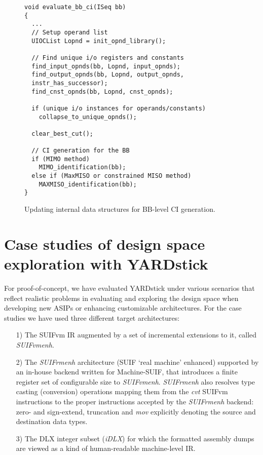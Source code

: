 \documentclass{comjnl}
\begin{document}
\begin{figure}[tb]
\centering
{
{\footnotesize
\begin{verbatim}
void evaluate_bb_ci(ISeq bb)
{
  ... 
  // Setup operand list
  UIOCList Lopnd = init_opnd_library();

  // Find unique i/o registers and constants
  find_input_opnds(bb, Lopnd, input_opnds);
  find_output_opnds(bb, Lopnd, output_opnds, 
  instr_has_successor);
  find_cnst_opnds(bb, Lopnd, cnst_opnds);

  if (unique i/o instances for operands/constants)
    collapse_to_unique_opnds();
  
  clear_best_cut();
  
  // CI generation for the BB
  if (MIMO method)
    MIMO_identification(bb);
  else if (MaxMISO or constrained MISO method)
    MAXMISO_identification(bb);
}
\end{verbatim}
}
}
\vspace{-0.125cm}
\caption{Updating internal data structures for BB-level CI generation.}
\label{Fig:3}
\end{figure}

\section{Case studies of design space exploration with YARDstick}
\label{Sec:DSE}
For proof-of-concept, we have evaluated YARDstick under various scenarios that reflect realistic problems in evaluating and exploring the design space when developing new ASIPs or enhancing customizable architectures. For the case studies we have used three different target architectures: 
\begin{enumerate}
\item [1)] {The SUIFvm IR \cite{MachSUIF} augmented by a set of incremental extensions to it, called {\it SUIFvmenh}.}
\item [2)] {The {\it SUIFrmenh} architecture (SUIF `real machine' enhanced) supported by an in-house backend written for Machine-SUIF, that introduces a finite register set of configurable size to {\it SUIFvmenh}. {\it SUIFrmenh} also resolves type casting (conversion) operations mapping them from the {\it cvt} SUIFvm instructions to the proper instructions accepted by the {\it SUIFrmenh} backend: zero- and sign-extend, truncation and {\it mov} explicitly denoting the source and destination data types.}
\item [3)] {The DLX integer subset ({\it iDLX}) for which the formatted assembly dumps are viewed as a kind of human-readable machine-level IR.}
\end{enumerate}
\end{document}
